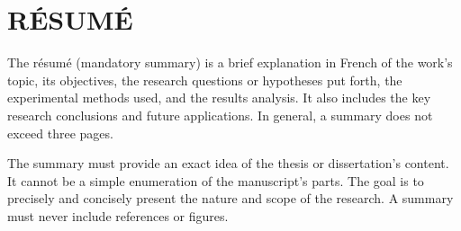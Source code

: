 %
%
\chapter*{RÉSUMÉ}\thispagestyle{headings}

The résumé (mandatory summary) is a brief explanation in French of the work’s topic, its objectives, the research questions or hypotheses put forth, the experimental methods used, and the results analysis. It also includes the key research conclusions and future applications. In general, a summary does not exceed three pages.

The summary must provide an exact idea of the thesis or dissertation’s content. It cannot be a simple enumeration of the manuscript’s parts. The goal is to precisely and concisely present the nature and scope of the research. A summary must never include references or figures. 
